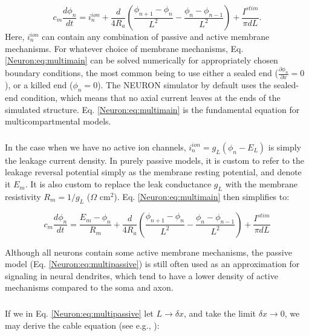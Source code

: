 \begin{equation}
c_m \frac{d\phi_n}{dt} = i_n^{ion} + \frac{d}{4R_a}\left(\frac{\phi_{n+1}-\phi_n}{L^2} - \frac{\phi_n-\phi_{n-1}}{L^2} \right) + \frac{I^{stim}}{\pi d L}.
\label{Neuron:eq:multimain}
\end{equation}
Here,  $i_n^{ion}$ can contain any combination of passive and active membrane mechanisms. For whatever choice of membrane mechanisms, Eq. \ref{Neuron:eq:multimain} can be solved numerically for appropriately chosen boundary conditions, the most common being to use either a sealed end ($\frac{\partial \phi_n}{\partial x} = 0$), or a killed end ($\phi_n=0$). The NEURON simulator by default uses the sealed-end condition, which means that no axial current leaves at the ends of the simulated structure. Eq. \ref{Neuron:eq:multimain} is the fundamental equation for multicompartmental models.


\subsubsection{}
\label{sec:Neuron:Passive_multicomp}

In the case when we have no active ion channels, $i_n^{ion} = g_L(\phi_n - E_L)$ is simply the leakage current density. In purely passive models, it is custom to refer to the leakage reversal potential simply as the membrane resting potential, and denote it $E_m$. It is also custom to replace the leak conductance $g_L$ with the membrane resistivity $R_m = 1/g_L$ ($\Omega$ cm$^2$). Eq. \ref{Neuron:eq:multimain} then simplifies to:

\begin{equation}
c_m \frac{d\phi_n}{dt} = \frac{E_m-\phi_n}{R_m} + \frac{d}{4R_a}\left(\frac{\phi_{n+1}-\phi_n}{L^2} - \frac{\phi_n-\phi_{n-1}}{L^2} \right) + \frac{I^{stim}}{\pi d L}
\label{Neuron:eq:multipassive}
\end{equation}

Although all neurons contain some active membrane mechanisms, the passive model (Eq. \ref{Neuron:eq:multipassive}) is still often used as an approximation for signaling in neural dendrites, which tend to have a lower density of active mechanisms compared to the soma and axon. 


\subsubsection{}
\label{sec:Neuron:cableeq}
If we in Eq. \ref{Neuron:eq:multipassive} let $L \rightarrow \delta x$, and take the limit $\delta x \rightarrow 0$, we may derive the cable equation (see e.g., \cite{Sterratt2011}): 

